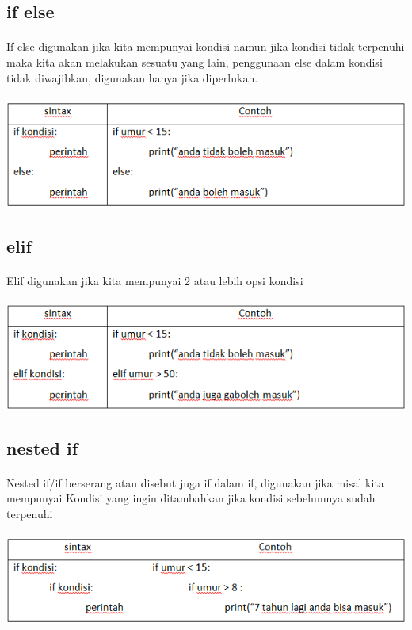 \documentclass[a4paper,12pt]{report}
\begin{document}
\subsection{if else}
\paragraph{}
If else digunakan jika kita mempunyai kondisi namun jika kondisi tidak terpenuhi maka kita akan melakukan sesuatu yang lain, penggunaan else dalam kondisi tidak diwajibkan, digunakan hanya jika diperlukan.\\ \\
\includegraphics[scale=1]{images/if else.png} 
\subsection{elif}
\paragraph{}
Elif digunakan jika kita mempunyai 2 atau lebih opsi kondisi\\ \\
\includegraphics[scale=1]{images/elif.png} 
\subsection{nested if}
\paragraph{}
Nested if/if berserang atau disebut juga if dalam if, digunakan jika misal kita mempunyai
Kondisi yang ingin ditambahkan jika kondisi sebelumnya sudah terpenuhi\\ \\
\includegraphics[scale=1]{images/nested if.png} 
\end{document}
